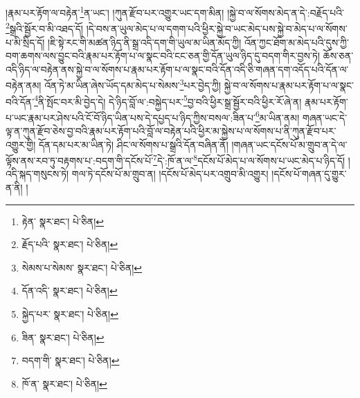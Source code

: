།རྣམ་པར་རྟོག་ལ་བརྟེན་\footnote{རྟེན་  སྣར་ཐང་།  པེ་ཅིན། }ན་ཡང་། །ཀུན་རྫོབ་པར་འགྱུར་ཡང་དག་མིན། །སྐྱེ་བ་ལ་སོགས་མེད་ན་དེ་:བརྗོད་པའི་\footnote{རྗོད་པའི་  སྣར་ཐང་།  པེ་ཅིན། }སྒྲའི་སྦྱོར་བ་མི་འཐད་དོ། །དེ་བས་ན་ཡུལ་མེད་པ་ལ་དགག་པའི་ཕྱིར་སྐྱེ་བ་ཡང་མེད་པས་སྐྱེ་བ་མེད་པ་ལ་སོགས་པ་མི་སྲིད་དོ། །ཇི་སྟེ་རང་གི་མཚན་ཉིད་ནི་སྒྲ་འདི་དག་གི་ཡུལ་མ་ཡིན་མོད་ཀྱི། འོན་ཀྱང་ཐོག་མ་མེད་པའི་དུས་ཀྱི་བག་ཆགས་ལས་བྱུང་བའི་རྣམ་པར་རྟོག་པ་ལ་སྣང་བའི་ངང་ཅན་གྱི་དོན་ཡུལ་ཉིད་དུ་བདག་གིར་བྱས་ཏེ། ཆོས་ཅན་འདི་ཉིད་ལ་བརྟེན་ནས་སྐྱེ་བ་ལ་སོགས་པ་རྣམ་པར་རྟོག་པ་ལ་སྣང་བའི་དོན་འདི་ཅི་གཞན་དག་འདོད་པའི་དོན་ལ་བརྟེན་ནམ། འོན་ཏེ་མ་ཡིན་ཞེས་ཡོད་དམ་མེད་པ་སེམས་\footnote{སེམས་པ་སེམས་  སྣར་ཐང་།  པེ་ཅིན། }པར་བྱེད་ཀྱི། སྐྱེ་བ་ལ་སོགས་པ་རྣམ་པར་རྟོག་པ་ལ་སྣང་བའི་དོན་\footnote{དོན་འདི་  སྣར་ཐང་།  པེ་ཅིན། }ནི་སྤོང་བར་མི་བྱེད་དེ། དེ་ཉིད་བློ་ལ་:བསྐྱེད་པར་\footnote{སྐྱེད་པར་  སྣར་ཐང་།  པེ་ཅིན། }བྱ་བའི་ཕྱིར་སྒྲ་སྦྱོར་བའི་ཕྱིར་རོ་ཞེ་ན། རྣམ་པར་རྟོག་པ་ཡང་རྣམ་པར་ཤེས་པའི་ངོ་བོ་ཉིད་ཡིན་པས་དེ་དཔྱད་པ་ཉིད་ཀྱིས་བསལ་:ཟིན་པ་\footnote{ཟིན་  སྣར་ཐང་།  པེ་ཅིན། }མ་ཡིན་ནམ། གཞན་ཡང་དེ་ལྟ་ན་ཀུན་རྫོབ་ཅེས་བྱ་བའི་རྣམ་པར་རྟོག་པའི་བློ་ལ་བརྟེན་པའི་ཕྱིར་མ་སྐྱེས་པ་ལ་སོགས་པ་ནི་ཀུན་རྫོབ་པར་འགྱུར་གྱི། དོན་དམ་པར་མ་ཡིན་ཏེ། ཤིང་ལ་སོགས་པ་སྒྲའི་དོན་བཞིན་ནོ། །གཞན་ཡང་དངོས་པོ་མ་གྲུབ་ན་དེ་ལ་ལྟོས་ནས་རབ་ཏུ་བརྟགས་པ་:བདག་གི་དངོས་པོ་\footnote{བདག་གི་  སྣར་ཐང་།  པེ་ཅིན། }དེ་:ཁོ་ན་ལ་\footnote{ཁོ་ན་  སྣར་ཐང་།  པེ་ཅིན། }དངོས་པོ་མེད་པ་ལ་སོགས་པ་ཡང་མེད་པ་ཉིད་དོ། །འདི་སྐད་གསུངས་ཏེ། གལ་ཏེ་དངོས་པོ་མ་གྲུབ་ན། །དངོས་པོ་མེད་པར་འགྲུབ་མི་འགྱུར། །དངོས་པོ་གཞན་དུ་གྱུར་ན་ནི། །
